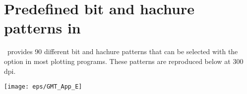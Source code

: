 %
%
\chapter{Predefined bit and hachure patterns in \gmt}
\thispagestyle{headings}

\GMT\ provides 90 different bit and hachure patterns that can be
selected with the  option in most plotting programs.
These patterns are reproduced below at 300 dpi.

\begin{center}
\texttt{[image: eps/GMT\_App\_E]}
\end{center}
